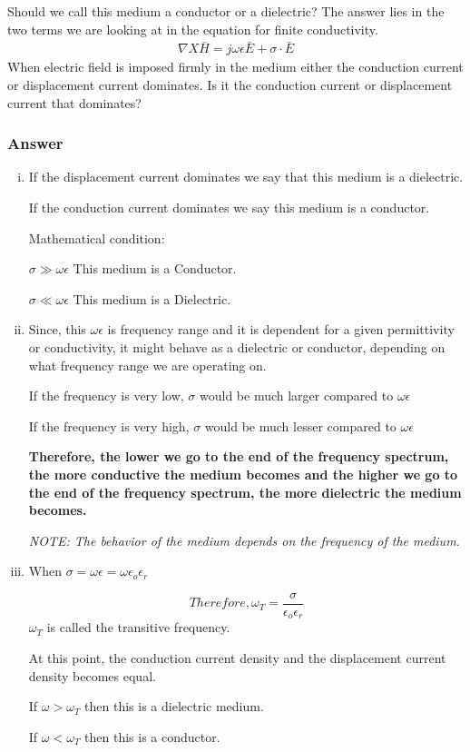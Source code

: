 \begin{exmp}
Should we call this medium a conductor or a dielectric? The answer lies in the two terms we are looking at in the equation for finite conductivity.
\begin{align*}
\nabla X \bar{H} = j\omega\epsilon\bar{E} + \sigma\cdot\bar{E} 
\end{align*}
When electric field is imposed firmly in the medium either the conduction current or displacement current dominates. Is it the conduction current or displacement current that dominates? 

\subsubsection*{Answer}
\begin{enumerate}[(i)]
\item If the displacement current dominates we say that this medium is a dielectric.

If the conduction current dominates we say this medium is a conductor.

Mathematical condition:

$\sigma \gg \omega\epsilon$ This medium is a Conductor.

$\sigma \ll \omega\epsilon$ This  medium is a Dielectric.

\item Since, this $\omega\epsilon$ is frequency range and it is dependent for a given permittivity or conductivity, it might behave as a dielectric or conductor, depending on what frequency range we are operating on. 

If the frequency is very low, $\sigma$ would be much larger compared to $\omega\epsilon$

If the frequency is very high, $\sigma$ would be much lesser compared to $\omega\epsilon$

\textbf{Therefore, the lower we go to the end of the frequency spectrum, the more conductive the medium becomes and the higher we go to the end of the frequency spectrum, the more dielectric the medium becomes.}

\textit{NOTE: The behavior of the medium depends on the frequency of the medium.}

\item When $\sigma = \omega\epsilon = \omega\epsilon_{o}\epsilon_{r}$

\begin{equation} Therefore,  \omega_{T} = \dfrac{\sigma}{\epsilon_{o}\epsilon_{r}}
\end{equation}
$\omega_{T}$ is called the transitive frequency.

At this point, the conduction current density and the displacement current density becomes equal.

If $\omega > \omega_{T}$ then this is a dielectric medium.

If $\omega < \omega_{T}$ then this is a conductor.
\end{enumerate}
\end{exmp}

